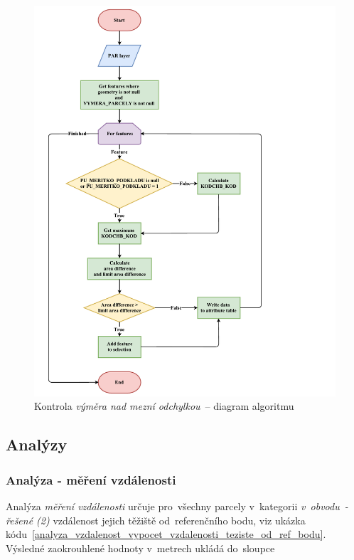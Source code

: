 	\begin{figure}[H] \centering
		\includegraphics[width=1.2\textwidth]{./pictures/vymera.pdf}
		\caption[Kontrola \textit{výměra nad mezní
odchylkou}~– diagram algoritmu]{Kontrola \textit{výměra nad mezní
odchylkou}~– diagram algoritmu}
		\label{fig:diagram_vymera}
 	\end{figure}

\subsection{Analýzy}
\label{analyzy}

\subsubsection{Analýza - měření vzdálenosti}
\label{analyza_vzdalenosti}

Analýza \textit{měření vzdálenosti} určuje pro~všechny parcely
v~kategorii \textit{v~obvodu~- řešené (2)} vzdálenost jejich těžiště
od~referenčního bodu, viz ukázka
kódu~\ref{analyza_vzdalenost_vypocet_vzdalenosti_teziste_od_ref_bodu}. Výsledné
zaokrouhlené hodnoty v~metrech ukládá do~sloupce
\texttt{}


